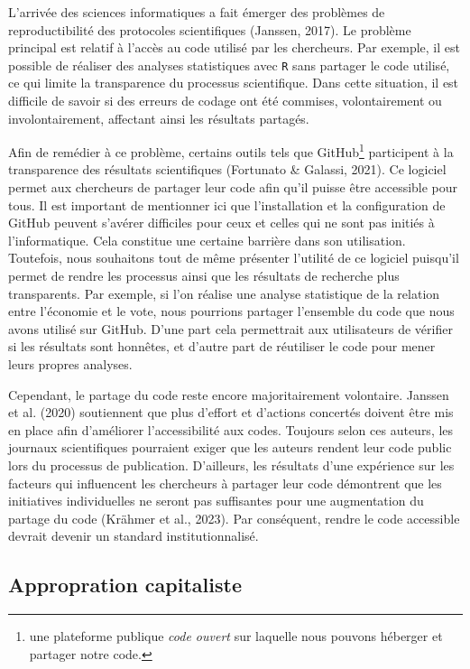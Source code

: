 \documentclass[
  letterpaper,
  DIV=11,
  numbers=noendperiod]{scrreprt}
\begin{document}
L'arrivée des sciences informatiques a fait émerger des problèmes de
reproductibilité des protocoles scientifiques (Janssen, 2017). Le
problème principal est relatif à l'accès au code utilisé par les
chercheurs. Par exemple, il est possible de réaliser des analyses
statistiques avec \texttt{R} sans partager le code utilisé, ce qui
limite la transparence du processus scientifique. Dans cette situation,
il est difficile de savoir si des erreurs de codage ont été commises,
volontairement ou involontairement, affectant ainsi les résultats
partagés.

Afin de remédier à ce problème, certains outils tels que
GitHub\footnote{une plateforme publique \emph{code ouvert} sur laquelle
  nous pouvons héberger et partager notre code.} participent à la
transparence des résultats scientifiques (Fortunato \& Galassi, 2021).
Ce logiciel permet aux chercheurs de partager leur code afin qu'il
puisse être accessible pour tous. Il est important de mentionner ici que
l'installation et la configuration de GitHub peuvent s'avérer difficiles
pour ceux et celles qui ne sont pas initiés à l'informatique. Cela
constitue une certaine barrière dans son utilisation. Toutefois, nous
souhaitons tout de même présenter l'utilité de ce logiciel puisqu'il
permet de rendre les processus ainsi que les résultats de recherche plus
transparents. Par exemple, si l'on réalise une analyse statistique de la
relation entre l'économie et le vote, nous pourrions partager l'ensemble
du code que nous avons utilisé sur GitHub. D'une part cela permettrait
aux utilisateurs de vérifier si les résultats sont honnêtes, et d'autre
part de réutiliser le code pour mener leurs propres analyses.

Cependant, le partage du code reste encore majoritairement volontaire.
Janssen et al. (2020) soutiennent que plus d'effort et d'actions
concertés doivent être mis en place afin d'améliorer l'accessibilité aux
codes. Toujours selon ces auteurs, les journaux scientifiques pourraient
exiger que les auteurs rendent leur code public lors du processus de
publication. D'ailleurs, les résultats d'une expérience sur les facteurs
qui influencent les chercheurs à partager leur code démontrent que les
initiatives individuelles ne seront pas suffisantes pour une
augmentation du partage du code (Krähmer et al., 2023). Par conséquent,
rendre le code accessible devrait devenir un standard institutionnalisé.

\hypertarget{appropration-capitaliste}{%
\subsection{Appropration capitaliste}\label{appropration-capitaliste}}
\end{document}

